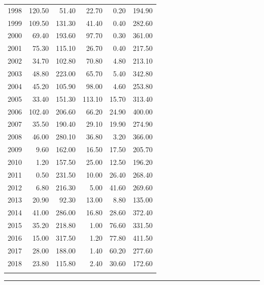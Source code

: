 \documentclass[12pt,]{article}
\begin{document}
\begin{longtable}{rrrrrr}
  1998 & 120.50 & 51.40 & 22.70 & 0.20 & 194.90 \\ 
  1999 & 109.50 & 131.30 & 41.40 & 0.40 & 282.60 \\ 
  2000 & 69.40 & 193.60 & 97.70 & 0.30 & 361.00 \\ 
  2001 & 75.30 & 115.10 & 26.70 & 0.40 & 217.50 \\ 
  2002 & 34.70 & 102.80 & 70.80 & 4.80 & 213.10 \\ 
  2003 & 48.80 & 223.00 & 65.70 & 5.40 & 342.80 \\ 
  2004 & 45.20 & 105.90 & 98.00 & 4.60 & 253.80 \\ 
  2005 & 33.40 & 151.30 & 113.10 & 15.70 & 313.40 \\ 
  2006 & 102.40 & 206.60 & 66.20 & 24.90 & 400.00 \\ 
  2007 & 35.50 & 190.40 & 29.10 & 19.90 & 274.90 \\ 
  2008 & 46.00 & 280.10 & 36.80 & 3.20 & 366.00 \\ 
  2009 & 9.60 & 162.00 & 16.50 & 17.50 & 205.70 \\ 
  2010 & 1.20 & 157.50 & 25.00 & 12.50 & 196.20 \\ 
  2011 & 0.50 & 231.50 & 10.00 & 26.40 & 268.40 \\ 
  2012 & 6.80 & 216.30 & 5.00 & 41.60 & 269.60 \\ 
  2013 & 20.90 & 92.30 & 13.00 & 8.80 & 135.00 \\ 
  2014 & 41.00 & 286.00 & 16.80 & 28.60 & 372.40 \\ 
  2015 & 35.20 & 218.80 & 1.00 & 76.60 & 331.50 \\ 
  2016 & 15.00 & 317.50 & 1.20 & 77.80 & 411.50 \\ 
  2017 & 28.00 & 188.00 & 1.40 & 60.20 & 277.60 \\ 
  2018 & 23.80 & 115.80 & 2.40 & 30.60 & 172.60 \\ 
   \hline
\hline
\label{tab:Reconstructed_Landings_byState}
\end{longtable}

\begin{center}\rule{0.5\linewidth}{\linethickness}\end{center}

\FloatBarrier
\newpage
\end{document}

